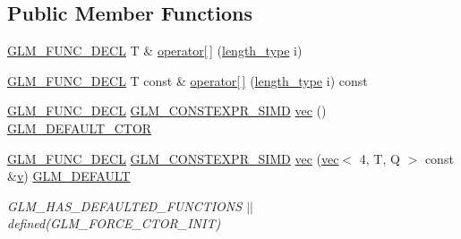 \subsection*{Public Member Functions}
\begin{DoxyCompactItemize}
\item 
\mbox{\hyperlink{setup_8hpp_ab2d052de21a70539923e9bcbf6e83a51}{G\+L\+M\+\_\+\+F\+U\+N\+C\+\_\+\+D\+E\+CL}} T \& \mbox{\hyperlink{structglm_1_1vec_3_014_00_01_t_00_01_q_01_4_a49fc7a64b8898f20a4f223a41c97eaef}{operator\mbox{[}$\,$\mbox{]}}} (\mbox{\hyperlink{structglm_1_1vec_3_014_00_01_t_00_01_q_01_4_af1c8f56963141951f4a4724b47e072d9}{length\+\_\+type}} i)
\item 
\mbox{\hyperlink{setup_8hpp_ab2d052de21a70539923e9bcbf6e83a51}{G\+L\+M\+\_\+\+F\+U\+N\+C\+\_\+\+D\+E\+CL}} T const  \& \mbox{\hyperlink{structglm_1_1vec_3_014_00_01_t_00_01_q_01_4_adea890cef20b856644085cc9fb20a2a2}{operator\mbox{[}$\,$\mbox{]}}} (\mbox{\hyperlink{structglm_1_1vec_3_014_00_01_t_00_01_q_01_4_af1c8f56963141951f4a4724b47e072d9}{length\+\_\+type}} i) const
\item 
\mbox{\hyperlink{setup_8hpp_ab2d052de21a70539923e9bcbf6e83a51}{G\+L\+M\+\_\+\+F\+U\+N\+C\+\_\+\+D\+E\+CL}} \mbox{\hyperlink{setup_8hpp_ae5de828d10226b21e2123dd61f3cb5ed}{G\+L\+M\+\_\+\+C\+O\+N\+S\+T\+E\+X\+P\+R\+\_\+\+S\+I\+MD}} \mbox{\hyperlink{structglm_1_1vec_3_014_00_01_t_00_01_q_01_4_a7ab4da90825b52bb9a7ef01268ac4d54}{vec}} () \mbox{\hyperlink{setup_8hpp_afb97a4e995bc004c0cbbfa22125b80ba}{G\+L\+M\+\_\+\+D\+E\+F\+A\+U\+L\+T\+\_\+\+C\+T\+OR}}
\item 
\mbox{\hyperlink{setup_8hpp_ab2d052de21a70539923e9bcbf6e83a51}{G\+L\+M\+\_\+\+F\+U\+N\+C\+\_\+\+D\+E\+CL}} \mbox{\hyperlink{setup_8hpp_ae5de828d10226b21e2123dd61f3cb5ed}{G\+L\+M\+\_\+\+C\+O\+N\+S\+T\+E\+X\+P\+R\+\_\+\+S\+I\+MD}} \mbox{\hyperlink{structglm_1_1vec_3_014_00_01_t_00_01_q_01_4_ad218b24398db0a16b0df3a0e64f6f638}{vec}} (\mbox{\hyperlink{structglm_1_1vec}{vec}}$<$ 4, T, Q $>$ const \&\mbox{\hyperlink{_s_d_l__opengl_8h_a10a82eabcb59d2fcd74acee063775f90}{v}}) \mbox{\hyperlink{setup_8hpp_aefce7051c376a64ba89fa93a9f63bc2c}{G\+L\+M\+\_\+\+D\+E\+F\+A\+U\+LT}}
\begin{DoxyCompactList}\small\item\em G\+L\+M\+\_\+\+H\+A\+S\+\_\+\+D\+E\+F\+A\+U\+L\+T\+E\+D\+\_\+\+F\+U\+N\+C\+T\+I\+O\+NS $\vert$$\vert$ defined(\+G\+L\+M\+\_\+\+F\+O\+R\+C\+E\+\_\+\+C\+T\+O\+R\+\_\+\+I\+N\+I\+T) \end{DoxyCompactList}\item 

\end{DoxyCompactItemize}
